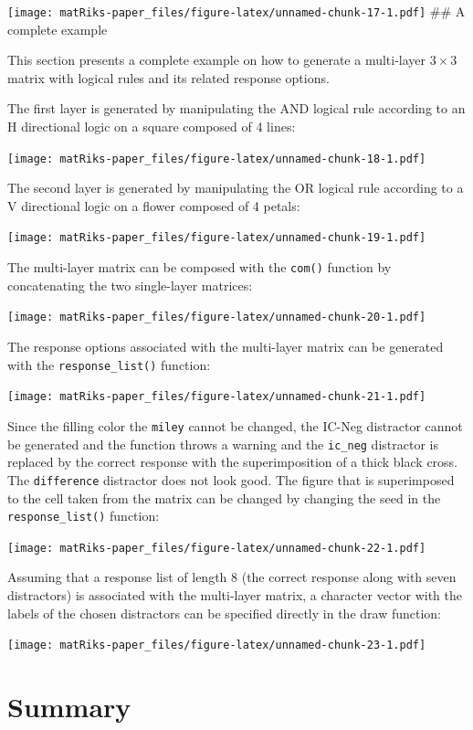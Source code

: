 \texttt{[image: matRiks-paper\_files/figure-latex/unnamed-chunk-17-1.pdf]}
\#\# A complete example

This section presents a complete example on how to generate a multi-layer \(3 \times 3\) matrix with logical rules and its related response options.

The first layer is generated by manipulating the AND logical rule according to an H directional logic on a square composed of 4 lines:

\texttt{[image: matRiks-paper\_files/figure-latex/unnamed-chunk-18-1.pdf]}

The second layer is generated by manipulating the OR logical rule according to a V directional logic on a flower composed of 4 petals:

\texttt{[image: matRiks-paper\_files/figure-latex/unnamed-chunk-19-1.pdf]}

The multi-layer matrix can be composed with the \texttt{com()} function by concatenating the two single-layer matrices:

\texttt{[image: matRiks-paper\_files/figure-latex/unnamed-chunk-20-1.pdf]}

The response options associated with the multi-layer matrix can be generated with the \texttt{response\_list()} function:

\texttt{[image: matRiks-paper\_files/figure-latex/unnamed-chunk-21-1.pdf]}

Since the filling color the \texttt{miley} cannot be changed, the IC-Neg distractor cannot be generated and the function throws a warning and the \texttt{ic\_neg} distractor is replaced by the correct response with the superimposition of a thick black cross.
The \texttt{difference} distractor does not look good. The figure that is superimposed to the cell taken from the matrix can be changed by changing the seed in the \texttt{response\_list()} function:

\texttt{[image: matRiks-paper\_files/figure-latex/unnamed-chunk-22-1.pdf]}

Assuming that a response list of length 8 (the correct response along with seven distractors) is associated with the multi-layer matrix, a character vector with the labels of the chosen distractors can be specified directly in the draw function:

\texttt{[image: matRiks-paper\_files/figure-latex/unnamed-chunk-23-1.pdf]}

\section{Summary}\label{summary}

